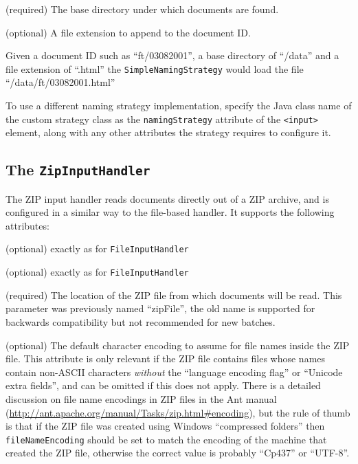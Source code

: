 \bde
\item[dir] (required) The base directory under which documents are found.
\item[fileExtension] (optional) A file extension to append to the document ID.
\ede

Given a document ID such as ``ft/03082001'', a base directory of ``/data'' and
a file extension of ``.html'' the \verb!SimpleNamingStrategy! would load the
file ``/data/ft/03082001.html''

To use a different naming strategy implementation, specify the Java class name
of the custom strategy class as the \verb!namingStrategy! attribute of the
\verb!<input>! element, along with any other attributes the strategy requires
to configure it.

\subsection{The {\tt ZipInputHandler}}

The ZIP input handler reads documents directly out of a ZIP archive, and is
configured in a similar way to the file-based handler.  It supports the
following attributes:

\bde
\item[encoding] (optional) exactly as for \verb!FileInputHandler!
\item[mimeType] (optional) exactly as for \verb!FileInputHandler!
\item[srcFile] (required) The location of the ZIP file from which documents
  will be read. This parameter was previously named ``zipFile'', the old name
  is supported for backwards compatibility but not recommended for new batches.
\item[fileNameEncoding] (optional) The default character encoding to assume for
  file names inside the ZIP file.  This attribute is only relevant if the ZIP
  file contains files whose names contain non-ASCII characters {\em without}
  the ``language encoding flag'' or ``Unicode extra fields'', and can be
  omitted if this does not apply.  There is a detailed discussion on file name
  encodings in ZIP files in the Ant manual
  (\url{http://ant.apache.org/manual/Tasks/zip.html#encoding}), but the rule of
  thumb is that if the ZIP file was created using Windows ``compressed
  folders'' then \verb!fileNameEncoding!  should be set to match the encoding
  of the machine that created the ZIP file, otherwise the correct value is
  probably ``Cp437'' or ``UTF-8''.
\ede

